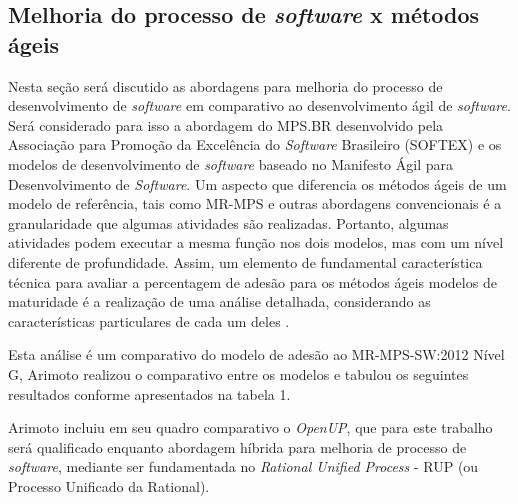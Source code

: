 \documentclass{acm_proc_article-sp}
\begin{document}
\subsection{Melhoria do processo de \textit{software} x métodos ágeis}
Nesta seção será discutido as abordagens para melhoria do processo de desenvolvimento de \textit{software} em comparativo ao desenvolvimento ágil de \textit{software}. Será considerado para isso a abordagem do MPS.BR desenvolvido pela Associação para Promoção da Excelência do \textit{Software} Brasileiro (SOFTEX) e os modelos de desenvolvimento de \textit{software} baseado no Manifesto Ágil para Desenvolvimento de \textit{Software}. Um aspecto que diferencia os métodos ágeis de um modelo de referência, tais como MR-MPS e
outras abordagens convencionais é a granularidade que algumas atividades são realizadas. Portanto, algumas atividades podem executar a mesma função nos dois modelos, mas com um nível diferente de profundidade. Assim, um elemento de fundamental
característica técnica para avaliar a percentagem de adesão para os métodos ágeis modelos de maturidade é a realização de uma análise detalhada, considerando as características particulares de cada um deles \cite{Arimoto:melhoria}.  

Esta análise é um comparativo do modelo de adesão ao MR-MPS-SW:2012 Nível G, Arimoto \cite{Arimoto:melhoria} realizou o comparativo entre os modelos e tabulou os seguintes resultados conforme apresentados na tabela 1.

Arimoto \cite{Arimoto:melhoria} incluiu em seu quadro comparativo o \textit{OpenUP}, que para este trabalho será qualificado enquanto abordagem híbrida para melhoria de processo de \textit{software}, mediante ser fundamentada no \textit{Rational Unified Process} - RUP (ou Processo Unificado da Rational).
\end{document}
